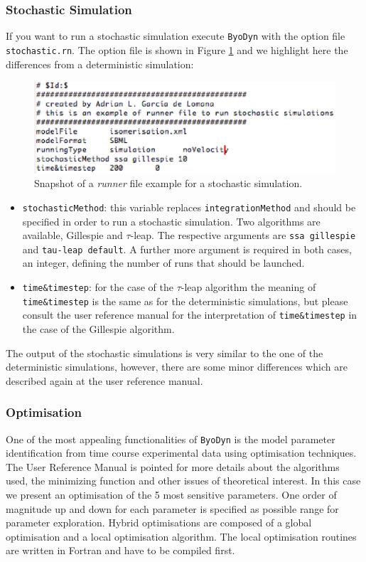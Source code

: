 \documentclass[a4paper, 11pt]{article}
\begin{document}
  \subsubsection{Stochastic Simulation} \label{stochastic}
  If you want to run a stochastic simulation execute \texttt{ByoDyn} with the option file \texttt{stochastic.rn}.
  The option file is shown in Figure \ref{stochasticRunner} and we highlight here the differences from a deterministic simulation:
  \begin{figure}[th!]
    \begin{center}
      \includegraphics[scale=.75]{figures/stochasticRunner.eps}
      \caption{
        Snapshot of a \emph{runner} file example for a stochastic simulation.
      }
      \label{stochasticRunner}
    \end{center}
  \end{figure}
  \begin{itemize}
    \item 
      \texttt{stochasticMethod}: this variable replaces \texttt{integrationMethod} and should be specified in order to run a stochastic simulation.
      Two algorithms are available, Gillespie and $\tau$-leap.
      The respective arguments are \texttt{ssa gillespie} and \texttt{tau-leap default}. 
      A further more argument is required in both cases, an integer, defining the number of runs that should be launched.
    \item
     \texttt{time\&timestep}: for the case of the $\tau$-leap algorithm the meaning of \texttt{time\&timestep} is the same as for the deterministic simulations, but please consult the user reference manual for the interpretation of \texttt{time\&timestep} in the case of the Gillespie algorithm.
  \end{itemize}
  The output of the stochastic simulations is very similar to the one of the deterministic simulations, however, there are some minor differences which are described again at the user reference manual.
  \subsubsection{Optimisation}  \label{optimisationSection}
  One of the most appealing functionalities of \texttt{ByoDyn} is the model parameter identification from time course experimental data using optimisation techniques. The User Reference Manual is pointed for more details about the algorithms used, the minimizing function and other issues of theoretical interest.
  In this case we present an optimisation of the 5 most sensitive parameters.
  One order of magnitude up and down for each parameter is specified as possible range for parameter exploration.
  Hybrid optimisations are composed of a global optimisation and a local optimisation algorithm.
  The local optimisation routines are written in Fortran and have to be compiled first.
\end{document}
